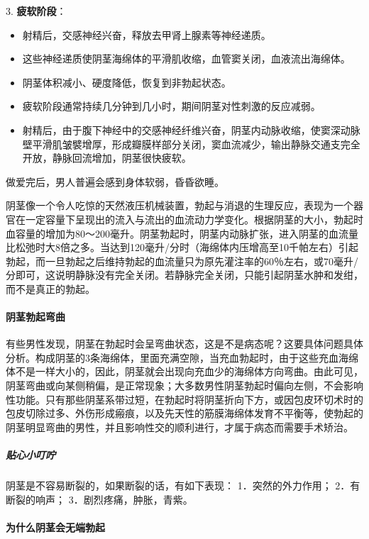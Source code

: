 3. \textbf{疲软阶段}：

  \begin{itemize}
  \item 射精后，交感神经兴奋，释放去甲肾上腺素等神经递质。
  \item 这些神经递质使阴茎海绵体的平滑肌收缩，血管窦关闭，血液流出海绵体。
  \item 阴茎体积减小、硬度降低，恢复到非勃起状态。
  \item 疲软阶段通常持续几分钟到几小时，期间阴茎对性刺激的反应减弱。
  \item 射精后，由于腹下神经中的交感神经纤维兴奋，阴茎内动脉收缩，使窦深动脉壁平滑肌皱襞增厚，形成瓣膜样部分关闭，窦血流减少，输出静脉交通支完全开放，静脉回流增加，阴茎很快疲软。
  \end{itemize}

做爱完后，男人普遍会感到身体软弱，昏昏欲睡。

阴茎像一个令人吃惊的天然液压机械装置，勃起与消退的生理反应，表现为一个器官在一定容量下呈现出的流入与流出的血流动力学变化。根据阴茎的大小，勃起时血容量的增加为80～200毫升。阴茎勃起时，阴茎内动脉扩张，进入阴茎的血流量比松弛时大8倍之多。当达到120毫升/分时（海绵体内压增高至10千帕左右）引起勃起，而一旦勃起之后维持勃起的血流量只为原先灌注率的60％左右，或70毫升/分即可，这说明静脉没有完全关闭。若静脉完全关闭，只能引起阴茎水肿和发绀，而不是真正的勃起。

\paragraph{阴茎勃起弯曲}

有些男性发现，阴茎在勃起时会呈弯曲状态，这是不是病态呢？这要具体问题具体分析。构成阴茎的3条海绵体，里面充满空隙，当充血勃起时，由于这些充血海绵体不是一样大小的，因此，阴茎就会出现向充血少的海绵体方向弯曲。由此可见，阴茎弯曲或向某侧稍偏，是正常现象；大多数男性阴茎勃起时偏向左侧，不会影响性功能。只有那些阴茎系带过短，在勃起时将阴茎折向下方，或因包皮环切术时的包皮切除过多、外伤形成瘢痕，以及先天性的筋膜海绵体发育不平衡等，使勃起的阴茎明显弯曲的男性，并且影响性交的顺利进行，才属于病态而需要手术矫治。

\subparagraph{贴心小叮咛}

阴茎是不容易断裂的，如果断裂的话，有如下表现：
1．突然的外力作用；
2．有断裂的响声；
3．剧烈疼痛，肿胀，青紫。

\paragraph{为什么阴茎会无端勃起}

